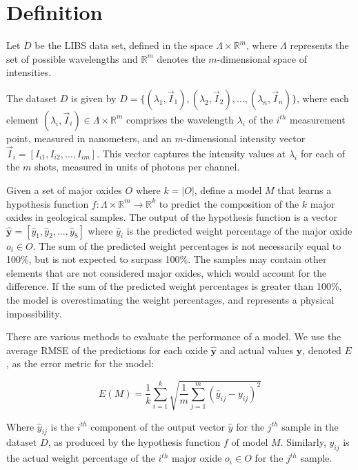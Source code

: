 \section{Definition}\label{sec:definition}
Let $D$ be the LIBS data set, defined in the space $\Lambda \times \mathbb{R}^m$, where $\Lambda$ represents the set of possible wavelengths and $\mathbb{R}^m$ denotes the $m$-dimensional space of intensities.

The dataset $D$ is given by $D = \{ (\lambda_1, \vec{I}_1), (\lambda_2, \vec{I}_2), \ldots, (\lambda_n, \vec{I}_n) \}$, where each element $(\lambda_i, \vec{I}_i) \in \Lambda \times \mathbb{R}^{m}$ comprises the wavelength $\lambda_i$ of the $i^{th}$ measurement point, measured in nanometers, and an $m$-dimensional intensity vector $\vec{I}_i = [I_{i1}, I_{i2}, \ldots, I_{im}]$.
This vector captures the intensity values at $\lambda_i$ for each of the $m$ shots, measured in units of photons per channel.

Given a set of major oxides $O$ where $k=|O|$, define a model $M$ that learns a hypothesis function $f: \Lambda \times \mathbb{R}^m \rightarrow \mathbb{R}^k$ to predict the composition of the $k$ major oxides in geological samples.
The output of the hypothesis function is a vector $\mathbf{\hat{y}} = [\hat{y}_{1}, \hat{y}_{2}, \ldots, \hat{y}_{8}]$ where $\hat{y}_{i}$ is the predicted weight percentage of the major oxide $o_i \in O$.
The sum of the predicted weight percentages is not necessarily equal to 100\%, but is not expected to surpass 100\%.
The samples may contain other elements that are not considered major oxides, which would account for the difference.
If the sum of the predicted weight percentages is greater than 100\%, the model is overestimating the weight percentages, and represents a physical impossibility.

There are various methods to evaluate the performance of a model.
We use the average RMSE of the predictions for each oxide $\mathbf{\hat{y}}$ and actual values $\mathbf{y}$, denoted $E$, as the error metric for the model:

\begin{equation}
    E(M) = \frac{1}{k} \sum_{i=1}^{k} \sqrt{\frac{1}{m} \sum_{j=1}^{m} (\hat{y}_{ij} - y_{ij})^2}
\end{equation}

Where \( \hat{y}_{ij} \) is the \( i^{th} \) component of the output vector \( \hat{y} \) for the \( j^{th} \) sample in the dataset \( D \), as produced by the hypothesis function \( f \) of model \( M \). Similarly, \( y_{ij} \) is the actual weight percentage of the \( i^{th} \) major oxide \( o_i \in O \) for the \( j^{th} \) sample.

